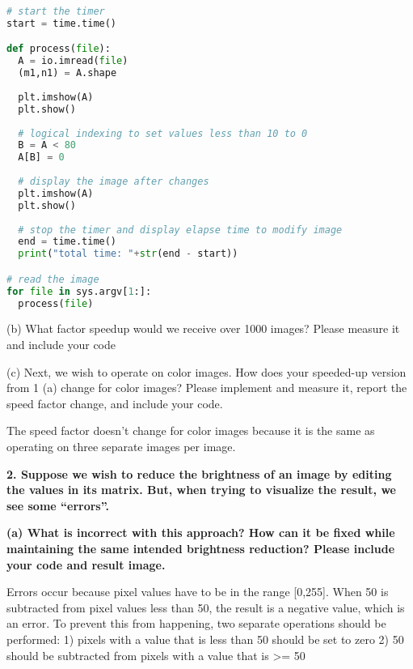 \documentclass[12pt]{article}
\begin{document}
% 

\begin{lstlisting}[frame=single,language=Python,caption=Logical Indexing of Greyscale Image\label{code:Grayscale}]
# start the timer
start = time.time()

def process(file):
  A = io.imread(file)
  (m1,n1) = A.shape
  
  plt.imshow(A)
  plt.show()
  
  # logical indexing to set values less than 10 to 0
  B = A < 80
  A[B] = 0
  
  # display the image after changes
  plt.imshow(A)
  plt.show()
  
  # stop the timer and display elapse time to modify image
  end = time.time()
  print("total time: "+str(end - start))

# read the image
for file in sys.argv[1:]:
  process(file)
\end{lstlisting}




(b) What factor speedup would we receive over 1000 images? Please measure it
and include your code




(c) Next, we wish to operate on color images. How does your speeded-up version
from 1 (a) change for color images? Please implement and measure it, report
the speed factor change, and include your code.

The speed factor doesn't change for color images because it is the same 
as operating on three separate images per image. 

\newpage
\textbf{2. Suppose we wish to reduce the brightness of an image by editing the values in its
matrix. But, when trying to visualize the result, we see some “errors”.}

\textbf{(a) What is incorrect with this approach? How can it be fixed while maintaining
the same intended brightness reduction? Please include your code and result
image.}

Errors occur because pixel values have to be in the range [0,255]. When 50
is subtracted from pixel values less than 50, the result is a negative value, 
which is an error. To prevent this from happening, two separate operations should
be performed: 
  1) pixels with a value that is less than 50 should be set to zero
  2) 50 should be subtracted from pixels with a value that is >= 50
\end{document}
